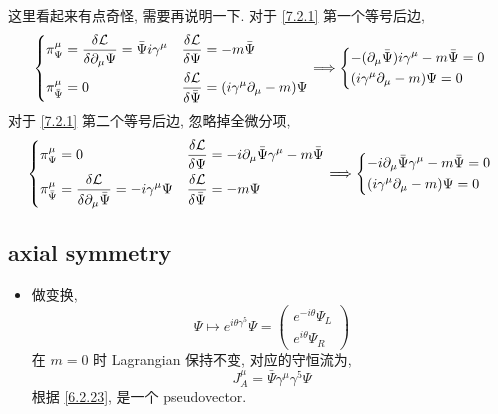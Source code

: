 \begin{itemize}
\begin{tcolorbox}[title=calculation:]
		这里看起来有点奇怪, 需要再说明一下. 对于 \eqref{7.2.1} 第一个等号后边,
		\begin{equation}
			\begin{dcases}
				\pi_\Psi^\mu = \frac{\delta \mathcal{L}}{\delta \partial_\mu \Psi} = \bar{\Psi} i \gamma^\mu & \frac{\delta \mathcal{L}}{\delta \Psi} = - m \bar{\Psi} \\
				\pi_{\bar{\Psi}}^\mu = 0 & \frac{\delta \mathcal{L}}{\delta \bar{\Psi}} = (i \gamma^\mu \partial_\mu - m) \Psi
			\end{dcases} \Longrightarrow \begin{dcases}
				- (\partial_\mu \bar{\Psi}) i \gamma^\mu - m \bar{\Psi} = 0 \\
				(i \gamma^\mu \partial_\mu - m) \Psi = 0
			\end{dcases}
		\end{equation}
		对于 \eqref{7.2.1} 第二个等号后边, 忽略掉全微分项,
		\begin{equation}
			\begin{dcases}
				\pi_\Psi^\mu = 0 & \frac{\delta \mathcal{L}}{\delta \Psi} = - i \partial_\mu \bar{\Psi} \gamma^\mu - m \bar{\Psi} \\
				\pi_{\bar{\Psi}}^\mu = \frac{\delta \mathcal{L}}{\delta \partial_\mu \bar{\Psi}} = - i \gamma^\mu \Psi & \frac{\delta \mathcal{L}}{\delta \bar{\Psi}} = - m \Psi
			\end{dcases} \Longrightarrow \begin{dcases}
				- i \partial_\mu \bar{\Psi} \gamma^\mu - m \bar{\Psi} = 0 \\
				(i \gamma^\mu \partial_\mu - m) \Psi = 0
			\end{dcases}
		\end{equation}
	\end{tcolorbox}
\end{itemize}

\subsection{axial symmetry}
\begin{itemize}
	\item 做变换,
	\begin{equation}
		\Psi \mapsto e^{i \theta \gamma^5} \Psi = \begin{pmatrix}
			e^{- i \theta} \Psi_L \\
			e^{i \theta} \Psi_R
		\end{pmatrix}
	\end{equation}
	在 $m = 0$ 时 Lagrangian 保持不变, 对应的守恒流为,
	\begin{equation}
		J_A^\mu = \bar{\Psi} \gamma^\mu \gamma^5 \Psi
	\end{equation}
	根据 \eqref{6.2.23}, 是一个 pseudovector.
\end{itemize}

